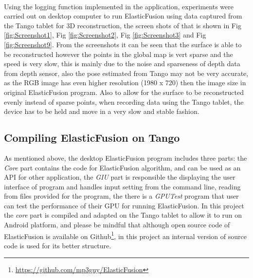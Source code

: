 \documentclass[12pt,twoside]{article}
\begin{document}
\\
Using the logging function implemented in the application, experiments were carried out on desktop computer to run 
ElasticFusion using data captured from the Tango tablet for 3D reconstruction, the screen shots of that is shown in Fig \ref{fig:Screenshot1}, Fig \ref{fig:Screenshot2}, Fig \ref{fig:Screenshot3} and Fig \ref{fig:Screenshot9}. From the screenshots it can be seen that the surface is able to be reconstructed however the points in the global map is vert sparse and the speed is very slow, this is mainly due to the noise and sparseness of depth data from depth sensor, also the pose estimated from Tango may not be very accurate, as the RGB image has even higher resolution (1980 x 720) then the image size in original ElasticFusion program. Also to allow for the surface to be reconstructed evenly instead of sparse points, when recording data using the Tango tablet, the device has to be held and move in a very slow and stable fashion. \\

\newpage

\subsection{Compiling ElasticFusion on Tango}
As mentioned above, the desktop ElasticFusion program includes three parts: the \textit{Core} part contains the code for ElasticFusion algorithm, and can be used as an API for other application, the \textit{GIU} part is responsible the displaying the user interface of program and handles input setting from the command line, reading from files provided for the program, the there is a \textit{GPUTest} program that user can test the performance of their GPU for running ElasticFusion. In this project the \textit{core} part is compiled and adapted on the Tango tablet to allow it to run on Android platform, and please be mindful that although open source code of ElasticFusion is available on Github\footnote{\url{https://github.com/mp3guy/ElasticFusion}}, in this project an internal version of source code is used for its better structure.\\
\end{document}
